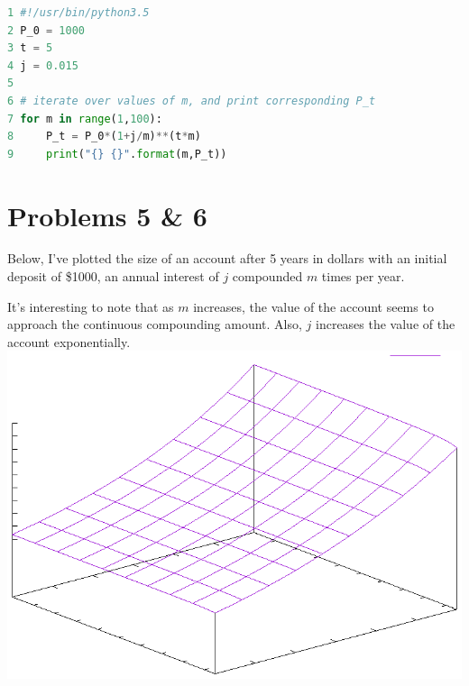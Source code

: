 \documentclass[12pt]{article}
\begin{document}
\begin{lstlisting}[language=python, caption=$P_t$ at different values of $m$]
1 #!/usr/bin/python3.5
2 P_0 = 1000
3 t = 5
4 j = 0.015
5 
6 # iterate over values of m, and print corresponding P_t
7 for m in range(1,100):
8     P_t = P_0*(1+j/m)**(t*m)
9     print("{} {}".format(m,P_t))
\end{lstlisting}


\section*{Problems 5 \& 6}
Below, I've plotted the size of an account after 5 years in dollars with an initial
 deposit of \$1000, an annual interest of $j$ compounded $m$ times per year.
 
 It's interesting to note that as $m$ increases, the value of the account seems to 
 approach the continuous compounding amount. Also, $j$ increases the value of the account
 exponentially.
\includegraphics[]{graph5.eps}
\end{document}
